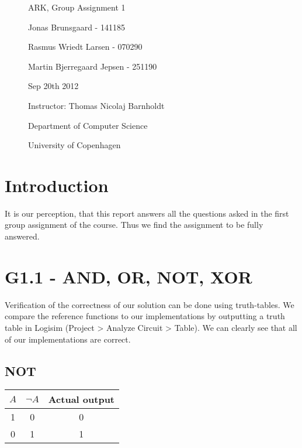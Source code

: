 \documentclass[11pt,a4paper]{article}
\begin{document}
\begin{figure}
  \thispagestyle{empty}
  \centering
    \vspace*{0.5cm}
    {\Huge ARK, Group Assignment 1 \par
    }\par
    \par
    \vspace*{0.4cm}
    \large Jonas Brunsgaard - 141185 \par
        Rasmus Wriedt Larsen - 070290 \par
        Martin Bjerregaard Jepsen - 251190 \par
    \vspace*{0.4cm}
    Sep 20th 2012 \par
    \vspace*{0.4cm}
    \small Instructor: Thomas Nicolaj Barnholdt \par
    \vspace*{0.4cm}
    \small Department of Computer Science \par
    \small University of Copenhagen \par
\end{figure}
\clearpage
\thispagestyle{plain}

\section*{Introduction}
It is our perception, that this report answers all the questions asked in the
first group assignment of the course. Thus we find the assignment to be fully
answered.

\section*{G1.1 - AND, OR, NOT, XOR}

Verification of the correctness of our solution can be done using truth-tables. We compare the reference
functions to our implementations by outputting a truth table in Logisim (Project > Analyze Circuit > Table).
We can clearly see that all of our implementations are correct.

\subsection*{NOT} %
\label{sub:NOT}

\begin{table}[htb!]
    \centering
    \begin{tabular}{c || c || c}
    $A$ & $\lnot A$ & Actual output \\ \hline
    1 & 0                & 0             \\
    0 & 1                & 1             \\
    \end{tabular}
\end{table}
\end{document}
